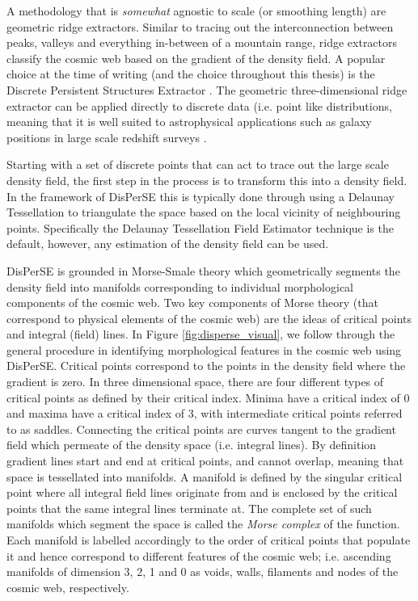 
A methodology that is \textit{somewhat} agnostic to scale (or smoothing length) are geometric ridge extractors. Similar to tracing out the interconnection between peaks, valleys and everything in-between of a mountain range, ridge extractors classify the cosmic web based on the gradient of the density field. A popular choice at the time of writing (and the choice throughout this thesis) is the Discrete Persistent Structures Extractor \citep[DisPerSE][]{sousbie2011a, sousbie2011b}. The geometric three-dimensional ridge extractor can be applied directly to discrete data (i.e. point like distributions, meaning that it is well suited to astrophysical applications such as galaxy positions in large scale redshift surveys \citep[e.g.][]{malavasi2017, kraljic2018}.

Starting with a set of discrete points that can act to trace out the large scale density field, the first step in the process is to transform this into a density field. In the framework of DisPerSE this is typically done through using a Delaunay Tessellation to triangulate the space based on the local vicinity of neighbouring points. Specifically the Delaunay Tessellation Field Estimator technique \citep[DTFE;][]{schaap2000, cautun2011} is the default, however, any estimation of the density field can be used. 

DisPerSE is grounded in Morse-Smale theory which geometrically segments the density field into manifolds corresponding to individual morphological components of the cosmic web. Two key components of Morse theory (that correspond to physical elements of the cosmic web) are the ideas of critical points and integral (field) lines. In Figure \ref{fig:disperse_visual}, we follow through the general procedure in identifying morphological features in the cosmic web using DisPerSE. Critical points correspond to the points in the density field where the gradient is zero. In three dimensional space, there are four different types of critical points as defined by their critical index. Minima have a critical index of 0 and maxima have a critical index of 3, with intermediate critical points referred to as saddles. Connecting the critical points are curves tangent to the gradient field which permeate of the density space (i.e. integral lines). By definition gradient lines start and end at critical points, and cannot overlap, meaning that space is tessellated into manifolds. A manifold is defined by the singular critical point where all integral field lines originate from and is enclosed by the critical points that the same integral lines terminate at. The complete set of such manifolds which segment the space is called the \textit{Morse complex} of the function. Each manifold is labelled accordingly to the order of critical points that populate it and hence correspond to different features of the cosmic web; i.e. ascending manifolds of dimension 3, 2, 1 and 0 as voids, walls, filaments and nodes of the cosmic web, respectively. 

